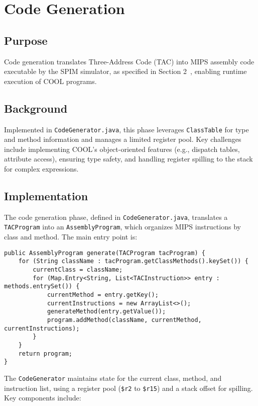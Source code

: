 \documentclass[11pt, titlepage]{article}
\begin{document}
\section{Code Generation}
\label{sec:codegen}

\subsection{Purpose}
Code generation translates Three-Address Code (TAC) into MIPS assembly code executable by the SPIM simulator, as specified in Section 2~\cite{cool_manual}, enabling runtime execution of COOL programs.

\subsection{Background}
Implemented in \texttt{CodeGenerator.java}, this phase leverages \texttt{ClassTable} for type and method information and manages a limited register pool. Key challenges include implementing COOL's object-oriented features (e.g., dispatch tables, attribute access), ensuring type safety, and handling register spilling to the stack for complex expressions.

\subsection{Implementation}
The code generation phase, defined in \texttt{CodeGenerator.java}, translates a \texttt{TACProgram} into an \texttt{AssemblyProgram}, which organizes MIPS instructions by class and method. The main entry point is:

\begin{lstlisting}
public AssemblyProgram generate(TACProgram tacProgram) {
    for (String className : tacProgram.getClassMethods().keySet()) {
        currentClass = className;
        for (Map.Entry<String, List<TACInstruction>> entry : methods.entrySet()) {
            currentMethod = entry.getKey();
            currentInstructions = new ArrayList<>();
            generateMethod(entry.getValue());
            program.addMethod(className, currentMethod, currentInstructions);
        }
    }
    return program;
}
\end{lstlisting}

The \texttt{CodeGenerator} maintains state for the current class, method, and instruction list, using a register pool (\texttt{\$r2} to \texttt{\$r15}) and a stack offset for spilling. Key components include:
\end{document}
